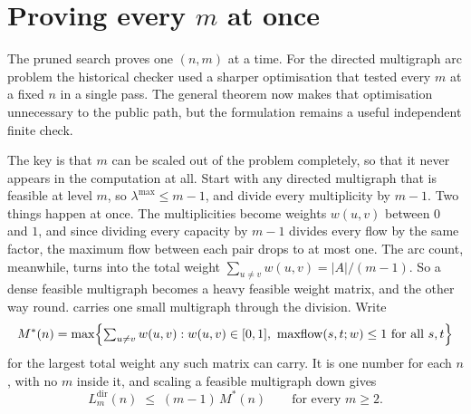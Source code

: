 \section{Proving every \texorpdfstring{$m$}{m} at once}

The pruned search proves one $(n,m)$ at a time. For the directed multigraph arc problem the historical checker used a sharper optimisation that tested every $m$ at a fixed $n$ in a single pass. The general theorem now makes that optimisation unnecessary to the public  path, but the formulation remains a useful independent finite check.

The key is that $m$ can be scaled out of the problem completely, so that it never appears in the computation at all. Start with any directed multigraph that is feasible at level $m$, so $\lambda^{\max} \le m - 1$, and divide every multiplicity by $m - 1$. Two things happen at once. The multiplicities become weights $w(u, v)$ between $0$ and $1$, and since dividing every capacity by $m - 1$ divides every flow by the same factor, the maximum flow between each pair drops to at most one. The arc count, meanwhile, turns into the total weight $\sum_{u \ne v} w(u, v) = |A| / (m - 1)$. So a dense feasible multigraph becomes a heavy feasible weight matrix, and the other way round.  carries one small multigraph through the division. Write
\[
    M^{*}(n) = \max\Bigl\{\textstyle\sum_{u \ne v} w(u, v) : w(u,v) \in [0,1], \ \mathrm{maxflow}(s, t; w) \le 1 \ \text{for all } s, t\Bigr\}
\]
for the largest total weight any such matrix can carry. It is one number for each $n$, with no $m$ inside it, and scaling a feasible multigraph down gives
\[
    L_m^{\mathrm{dir}}(n) \;\le\; (m - 1)\, M^{*}(n)
    \qquad \text{for every } m \ge 2 .
\]

